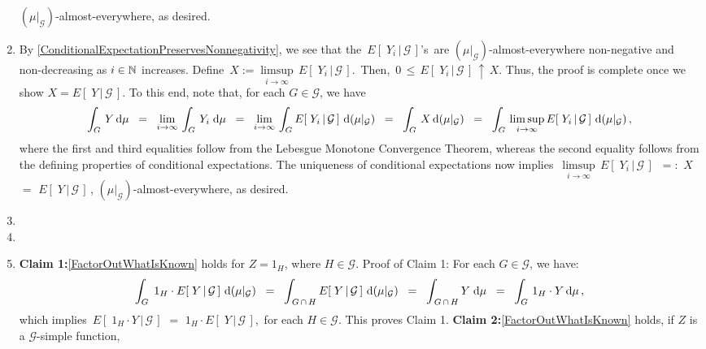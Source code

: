 \begin{enumerate}
	$(\mu\vert_{\mathcal{G}})$-almost-everywhere, as desired.
\item
	By \eqref{ConditionalExpectationPreservesNonnegativity}, we see that the
	\,$E\!\left[\;Y_{i}\,\vert\,\mathcal{G}\,\right]$'s\,
	are $(\mu\vert_{\mathcal{G}})$-almost-everywhere non-negative and non-decreasing as $i \in \mathbb{N}$ increases.
	Define \,$X := \underset{i\rightarrow\infty}{\limsup}\,E\!\left[\;Y_{i}\,\vert\,\mathcal{G}\,\right]$.\,
	Then, \,$0\,\leq\,E\!\left[\;Y_{i}\,\vert\,\mathcal{G}\,\right] \,\uparrow\, X$.
	Thus, the proof is complete once we show $X = E\!\left[\;Y\,\vert\,\mathcal{G}\,\right]$.
	To this end, note that, for each $G \in \mathcal{G}$, we have
	\begin{equation*}
	\int_{G}\,Y\,\textnormal{d}\mu
	\;\;=\;\;
	\underset{i\rightarrow\infty}{\lim}\,\int_{G}\,Y_{i}\;\textnormal{d}\mu
	\;\;=\;\;
	\underset{i\rightarrow\infty}{\lim}\,\int_{G}E\!\left[\;Y_{i}\,\vert\,\mathcal{G}\,\right]\,\textnormal{d}(\mu\vert_{\mathcal{G}})
	\;\;=\;\;
	\int_{G}\,X\,\textnormal{d}(\mu\vert_{\mathcal{G}})
	\;\;=\;\;
	\int_{G}\,\underset{i\rightarrow\infty}{\limsup}\,E\!\left[\;Y_{i}\,\vert\,\mathcal{G}\,\right]\,\textnormal{d}(\mu\vert_{\mathcal{G}})\,,
	\end{equation*}
	where the first and third equalities follow from the Lebesgue Monotone Convergence Theorem,
	whereas the second equality follows from the defining properties of conditional expectations.
	The uniqueness of conditional expectations now implies
	\,$\underset{i\rightarrow\infty}{\limsup}\,E\!\left[\;Y_{i}\,\vert\,\mathcal{G}\,\right]$
	\,$=:$ $X$ $=$ $E\!\left[\;Y\,\vert\,\mathcal{G}\,\right]$\,,
	$(\mu\vert_{\mathcal{G}})$-almost-everywhere, as desired.
\item
\item
\item
	\textbf{Claim 1:}\;\;\eqref{FactorOutWhatIsKnown} holds for $Z = 1_{H}$, where $H \in \mathcal{G}$.
	\vskip 0.0cm
	Proof of Claim 1: For each $G \in \mathcal{G}$, we have:
	\begin{equation*}
	\int_{G}\;1_{H} \cdot E\!\left[\;Y\,\vert\,\mathcal{G}\,\right]\,\textnormal{d}(\mu\vert_{\mathcal{G}})
	\;\; = \;\;
	\int_{\,G\,\cap\,H}E\!\left[\;Y\,\vert\,\mathcal{G}\,\right]\,\textnormal{d}(\mu\vert_{\mathcal{G}})
	\;\; = \;\;
	\int_{\,G\,\cap\,H} Y\;\textnormal{d}\mu
	\;\; = \;\;
	\int_{G}\,1_{H} \cdot Y\,\textnormal{d}\mu\,,
	\end{equation*}
	which implies \,$E\!\left[\;1_{H}\cdot Y\,\vert\,\mathcal{G}\,\right]$
	$=$ $1_{H}\cdot E\!\left[\;Y\,\vert\,\mathcal{G}\,\right]$,\,
	for each $H \in \mathcal{G}$.
	This proves Claim 1.
	\vskip 0.4cm
	\textbf{Claim 2:}\;\;\eqref{FactorOutWhatIsKnown} holds, if $Z$ is a $\mathcal{G}$-simple function,

\end{enumerate}
